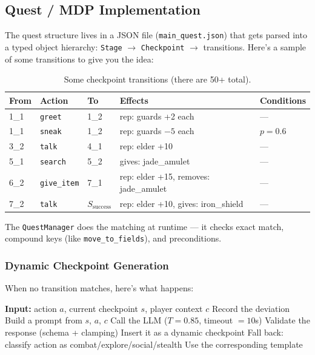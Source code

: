 \subsection{Quest / MDP Implementation}

The quest structure lives in a JSON file (\texttt{main\_quest.json}) that gets parsed into a typed object hierarchy: \texttt{Stage} $\to$ \texttt{Checkpoint} $\to$ transitions. Here's a sample of some transitions to give you the idea:

\begin{table}[ht]
\centering
\caption{Some checkpoint transitions (there are 50+ total).}
\label{tab:transitions}
\begin{tabular}{@{}lllll@{}}
\toprule
From & Action & To & Effects & Conditions \\
\midrule
1\_1 & \texttt{greet} & 1\_2 & rep: guards +2 each & --- \\
1\_1 & \texttt{sneak} & 1\_2 & rep: guards $-5$ each & $p = 0.6$ \\
3\_2 & \texttt{talk} & 4\_1 & rep: elder +10 & --- \\
5\_1 & \texttt{search} & 5\_2 & gives: jade\_amulet & --- \\
6\_2 & \texttt{give\_item} & 7\_1 & rep: elder +15, removes: jade\_amulet & --- \\
7\_2 & \texttt{talk} & $S_{\text{success}}$ & rep: elder +10, gives: iron\_shield & --- \\
\bottomrule
\end{tabular}
\end{table}

The \texttt{QuestManager} does the matching at runtime --- it checks exact match, compound keys (like \texttt{move\_to\_fields}), and preconditions.

\subsubsection{Dynamic Checkpoint Generation}

When no transition matches, here's what happens:

\begin{algorithm}[H]
\caption{Dynamic Checkpoint Generation}
\begin{algorithmic}[1]
\STATE \textbf{Input:} action $a$, current checkpoint $s$, player context $c$
\STATE Record the deviation
    \STATE Build a prompt from $s$, $a$, $c$
        \STATE Call the LLM ($T = 0.85$, timeout $= 10$s)
        \STATE Validate the response (schema + clamping)
            \RETURN Insert it as a dynamic checkpoint
        \ENDIF
    \ENDFOR
\ENDIF
\STATE Fall back: classify action as combat/explore/social/stealth
\RETURN Use the corresponding template
\end{algorithmic}
\end{algorithm}

